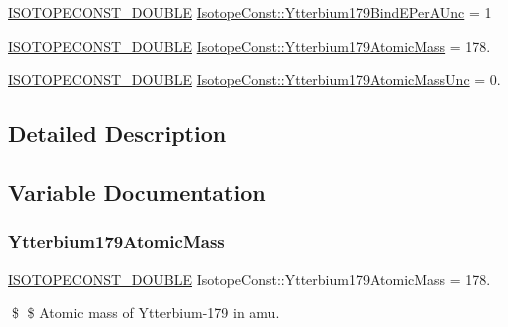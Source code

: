 \begin{DoxyCompactItemize}
\mbox{\hyperlink{group___isotope_const-_macros_ga8f45a7272ce02c0b4c65c44636ed719a}{I\+S\+O\+T\+O\+P\+E\+C\+O\+N\+S\+T\+\_\+\+D\+O\+U\+B\+LE}} \mbox{\hyperlink{group___isotope_const-_ytterbium-_yb179_gac0e5e1e4487bba2ee9f7fde03e9db4fa}{Isotope\+Const\+::\+Ytterbium179\+Bind\+E\+Per\+A\+Unc}} = 1
\item 
\mbox{\hyperlink{group___isotope_const-_macros_ga8f45a7272ce02c0b4c65c44636ed719a}{I\+S\+O\+T\+O\+P\+E\+C\+O\+N\+S\+T\+\_\+\+D\+O\+U\+B\+LE}} \mbox{\hyperlink{group___isotope_const-_ytterbium-_yb179_gaf75dfd06bb0855b8381d7fe88faffb41}{Isotope\+Const\+::\+Ytterbium179\+Atomic\+Mass}} = 178.
\item 
\mbox{\hyperlink{group___isotope_const-_macros_ga8f45a7272ce02c0b4c65c44636ed719a}{I\+S\+O\+T\+O\+P\+E\+C\+O\+N\+S\+T\+\_\+\+D\+O\+U\+B\+LE}} \mbox{\hyperlink{group___isotope_const-_ytterbium-_yb179_ga42948344031d40844b883ab05bb0b87b}{Isotope\+Const\+::\+Ytterbium179\+Atomic\+Mass\+Unc}} = 0.
\end{DoxyCompactItemize}


\subsection{Detailed Description}


\subsection{Variable Documentation}
\mbox{\label{group___isotope_const-_ytterbium-_yb179_gaf75dfd06bb0855b8381d7fe88faffb41}} 
\subsubsection{\texorpdfstring{Ytterbium179\+Atomic\+Mass}{Ytterbium179AtomicMass}}
{\footnotesize\ttfamily \mbox{\hyperlink{group___isotope_const-_macros_ga8f45a7272ce02c0b4c65c44636ed719a}{I\+S\+O\+T\+O\+P\+E\+C\+O\+N\+S\+T\+\_\+\+D\+O\+U\+B\+LE}} Isotope\+Const\+::\+Ytterbium179\+Atomic\+Mass = 178.}

\$ \$ Atomic mass of Ytterbium-\/179 in amu. \mbox{\label{group___isotope_const-_ytterbium-_yb179_ga42948344031d40844b883ab05bb0b87b}} 
